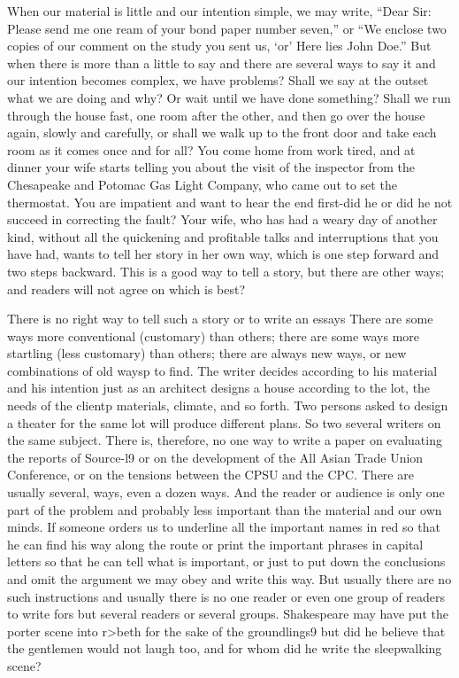 \documentclass[
    oneside,
    11pt,
]{memoir}
\begin{document}
When our material is little and our intention simple, we may write, \enquote{Dear Sir: Please send me one ream of your bond paper number seven,} or \enquote{We enclose two copies of our comment on the study you sent us, \enquote{or} Here lies John Doe.} But when there is more than a little to say and there are several ways to say it and our intention becomes complex, we have problems? Shall we say at the outset what we are doing and why? Or wait until we have done something? Shall we run through the house fast, one room after the other, and then go over the house again, slowly and carefully, or shall we walk up to the front door and take each room as it comes once and for all? You come home from work tired, and at dinner your wife starts telling you about the visit of the inspector from the Chesapeake and Potomac Gas Light Company, who came out to set the thermostat. You are impatient and want to hear the end first-did he or did he not succeed in correcting the fault? Your wife, who has had a weary day of another kind, without all the quickening and profitable talks and interruptions that you have had, wants to tell her story in her own way, which is one step forward and two steps backward. This is a good way to tell a story, but there are other ways; and readers will not agree on which is best?

There is no right way to tell such a story or to write an essays There are some ways more conventional (customary) than others; there are some ways more startling (less customary) than others; there are always new ways, or new combinations of old waysp to find. The writer decides according to his material and his intention just as an architect designs a house according to the lot, the needs of the clientp materials, climate, and so forth. Two persons asked to design a theater for the same lot will produce different plans. So two several writers on the same subject. There is, therefore, no one way to write a paper on evaluating the reports of Source-l9 or on the development of the All Asian Trade Union Conference, or on the tensions between the CPSU and the CPC. There are usually several, ways, even a dozen ways. And the reader or audience is only one part of the problem and probably less important than the material and our own minds. If someone orders us to underline all the important names in red so that he can find his way along the route or print the important phrases in capital letters so that he can tell what is important, or just to put down the conclusions and omit the argument we may obey and write this way. But usually there are no such instructions and usually there is no one reader or even one group of readers to write fors but several readers or several groups. Shakespeare may have put the porter scene into r>beth for the sake of the groundlings9 but did he believe that the gentlemen would not laugh too, and for whom did he write the sleepwalking scene?
\end{document}
